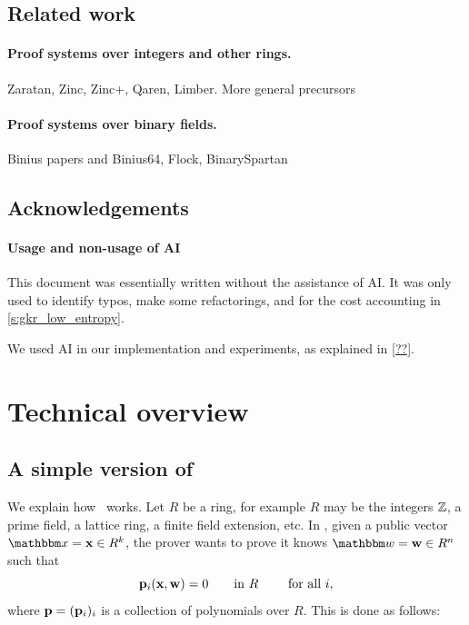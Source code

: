 \documentclass[11pt,letterpaper,usenames,dvipsnames]{article}
\begin{document}
\subsection{Related work}
\paragraph{Proof systems over integers and other rings.}

 Zaratan, Zinc, Zinc+, Qaren, Limber. More general precursors

\paragraph{Proof systems over binary fields.} Binius papers and Binius64, Flock, BinarySpartan

\subsection{Acknowledgements}



\paragraph{Usage and non-usage of AI} This document was essentially written without the assistance of AI. It was only used to identify typos, make some refactorings, and for the cost accounting in \cref{s:gkr_low_entropy}. 

We used AI in our implementation and experiments, as explained in \cref{??}.

\section{Technical overview}


\subsection{A simple version of \ftwoz}

We explain how \ftwoz \ works.  Let  $R$ be a ring, for example $R$ may be the integers $\mathbb{Z}$, a prime field, a lattice ring, a finite field extension, etc. In \ftwoz, given a public vector $\inp=\xx\in R^\inplen$, the prover wants to prove it knows $\wit=\ww\in R^n$ such that \begin{equation}\label{e:intro_eq_0}\mathbf{p}_i(\mathbf{x},\mathbf{w})=0 \qquad \text{in  } R \qquad \text{ for all } i, \end{equation} where $\mathbf{p}=(\mathbf{p}_i)_i$ is a collection of polynomials over $R$.  This is done as follows:
\end{document}

